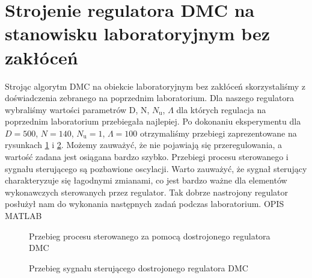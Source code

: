 \section{Strojenie regulatora DMC na stanowisku laboratoryjnym bez zakłóceń}
\label{zad4_lab_opis}
Strojąc algorytm DMC na obiekcie laboratoryjnym bez zakłóceń skorzystaliśmy z doświadczenia zebranego na poprzednim laboratorium. Dla naszego regulatora wybraliśmy wartości parametrów D, N, $N_\mathrm{u}$, $\Lambda$ dla których regulacja na poprzednim laboratorium przebiegała najlepiej. Po dokonaniu eksperymentu dla $D = 500$, $N = 140$, $N_\mathrm{u} = 1$, $\Lambda = 100$ otrzymaliśmy przebiegi zaprezentowane na rysunkach \ref{lab_zad4_lab_proces} i \ref{lab_zad4_lab_ster}. Możemy zauważyć, że nie pojawiają się przeregulowania, a wartość zadana jest osiągana bardzo szybko. Przebiegi procesu sterowanego i sygnału sterującego są pozbawione oscylacji. Warto zauważyć, że sygnał sterujący charakteryzuje się łagodnymi zmianami, co jest bardzo ważne dla elementów wykonawczych sterowanych przez regulator. Tak dobrze nastrojony regulator posłużył nam do wykonania następnych zadań podczas laboratorium. OPIS MATLAB 
\begin{figure}[t]
    \label{lab_zad4_lab_proces}
    \centering
    \caption{Przebieg procesu sterowanego za pomocą dostrojonego regulatora DMC}
\end{figure}

\begin{figure}[b]
    \label{lab_zad4_lab_ster}
    \centering
    \caption{Przebieg sygnału sterującego dostrojonego regulatora DMC}
\end{figure}
\FloatBarrier